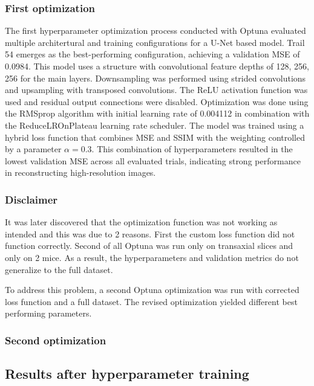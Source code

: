 \documentclass[twocolumn]{article}
\begin{document}
\subsubsection{First optimization}
The first hyperparameter optimization process conducted with Optuna evaluated multiple architertural and training configurations for a U-Net based model. 
Trail 54 emerges as the best-performing configuration, achieving a validation MSE of 0.0984. 
This model uses a structure with convolutional feature depths of 128, 256, 256 for the main layers. 
Downsampling was performed using strided convolutions and upsampling with transposed convolutions. 
The ReLU activation function was used and residual output connections were disabled. 
Optimization was done using the RMSprop algorithm with initial learning rate of 0.004112 in combination with the ReduceLROnPlateau learning rate scheduler. 
The model was trained using a hybrid loss function that combines MSE and SSIM with the weighting controlled by a parameter $\alpha=0.3$.
This combination of hyperparameters resulted in the lowest validation MSE across all evaluated trials, indicating strong performance in reconstructing high-resolution images. 

\subsubsection{Disclaimer}
It was later discovered that the optimization function was not working as intended and this was due to 2 reasons.
First the custom loss function did not function correctly. Second of all Optuna was run only on transaxial slices and only on 2 mice. 
As a result, the hyperparameters and validation metrics do not generalize to the full dataset. 

To address this problem, a second Optuna optimization was run with corrected loss function and a full dataset. 
The revised optimization yielded different best performing parameters. 

\subsubsection{Second optimization}


\subsection{Results after hyperparameter training}
\end{document}
